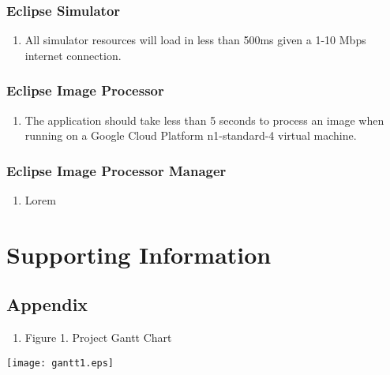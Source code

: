 \documentclass[10pt, onecolumn, draftclsnofoot, letterpaper, compsoc]{IEEEtran}
\begin{document}
\subsubsection{Eclipse Simulator}
	\begin{enumerate}
		\item All simulator resources will load in less than 500ms given a 1-10
		 Mbps internet connection.
	\end{enumerate}

\subsubsection{Eclipse Image Processor}
	\begin{enumerate}
		\item The application should take less than 5 seconds to process an
		 image when running on a Google Cloud Platform n1-standard-4 virtual
		 machine.
	\end{enumerate}

\subsubsection{Eclipse Image Processor Manager}
	\begin{enumerate}
		\item Lorem
	\end{enumerate}

\newpage
\section{Supporting Information}

\subsection{Appendix}

\begin{enumerate}
	\item Figure 1. Project Gantt Chart 
\end{enumerate}

\begin{center}
	\texttt{[image: gantt1.eps]}
\end{center}
\end{document}

